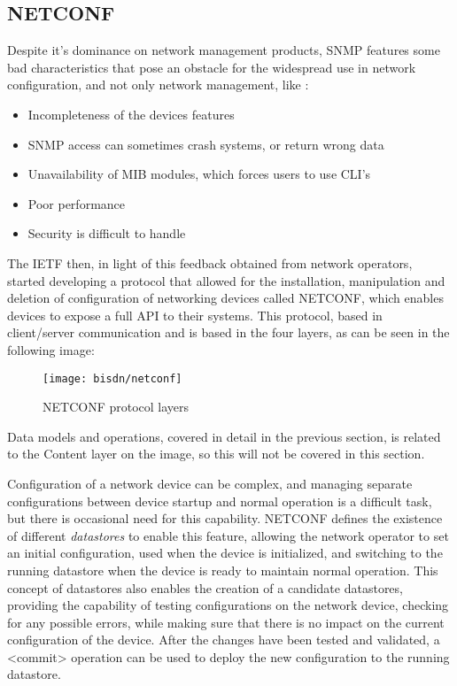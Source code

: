 \subsection {NETCONF} \label {sec:netconf}

Despite it's dominance on network management products, SNMP features some bad characteristics that pose an obstacle for the widespread use in network configuration,
and not only network management, like \cite{schonwalder_overview_2003}: 

\begin {itemize}
    \item Incompleteness of the devices features
    \item SNMP access can sometimes crash systems, or return wrong data
    \item Unavailability of MIB modules, which forces users to use CLI's
    \item Poor performance 
    \item Security is difficult to handle
\end {itemize}

\par The IETF then, in light of this feedback obtained from network operators, started developing a protocol that allowed for the installation, manipulation and 
deletion of configuration of networking devices called NETCONF, which enables devices to expose a full API to their systems. This protocol, based in client/server
communication and is based in the four layers, as can be seen in the following image:

\begin{figure} [!htbp]
    \centering
    \texttt{[image: bisdn/netconf]}
    \caption{NETCONF protocol layers \cite{enns_network_2011}}
\end{figure}

\par Data models and operations, covered in detail in the previous section, is related to the Content layer on the image, so this will not be covered in this
section. 

\par Configuration of a network device can be complex, and managing separate configurations between device startup and normal operation is a difficult task, but
there is occasional need for this capability. NETCONF defines the existence of different \textit{datastores} to enable this feature, allowing the network operator to
set an initial configuration, used when the device is initialized, and switching to the running datastore when the device is ready to maintain normal operation. This
concept of datastores also enables the creation of a candidate datastores, providing the capability of testing configurations on the network device, checking for any
possible errors, while making sure that there is no impact on the current configuration of the device. After the changes have been tested and validated, a <commit>
operation can be used to deploy the new configuration to the running datastore.

